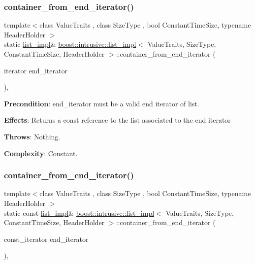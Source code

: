 \subsubsection{\texorpdfstring{container\+\_\+from\+\_\+end\+\_\+iterator()}{container\_from\_end\_iterator()}\hspace{0.1cm}{\footnotesize\ttfamily [1/2]}}
{\footnotesize\ttfamily template$<$class Value\+Traits , class Size\+Type , bool Constant\+Time\+Size, typename Header\+Holder $>$ \\
static \hyperlink{classboost_1_1intrusive_1_1list__impl}{list\+\_\+impl}\& \hyperlink{classboost_1_1intrusive_1_1list__impl}{boost\+::intrusive\+::list\+\_\+impl}$<$ Value\+Traits, Size\+Type, Constant\+Time\+Size, Header\+Holder $>$\+::container\+\_\+from\+\_\+end\+\_\+iterator (\begin{DoxyParamCaption}\item[{iterator}]{end\+\_\+iterator }\end{DoxyParamCaption})\hspace{0.3cm}{\ttfamily [inline]}, {\ttfamily [static]}}

{\bfseries Precondition}\+: end\+\_\+iterator must be a valid end iterator of list.

{\bfseries Effects}\+: Returns a const reference to the list associated to the end iterator

{\bfseries Throws}\+: Nothing.

{\bfseries Complexity}\+: Constant. \mbox{\label{classboost_1_1intrusive_1_1list__impl_a1dabad9119bf0e3ab256f08944e14521}} 
\subsubsection{\texorpdfstring{container\+\_\+from\+\_\+end\+\_\+iterator()}{container\_from\_end\_iterator()}\hspace{0.1cm}{\footnotesize\ttfamily [2/2]}}
{\footnotesize\ttfamily template$<$class Value\+Traits , class Size\+Type , bool Constant\+Time\+Size, typename Header\+Holder $>$ \\
static const \hyperlink{classboost_1_1intrusive_1_1list__impl}{list\+\_\+impl}\& \hyperlink{classboost_1_1intrusive_1_1list__impl}{boost\+::intrusive\+::list\+\_\+impl}$<$ Value\+Traits, Size\+Type, Constant\+Time\+Size, Header\+Holder $>$\+::container\+\_\+from\+\_\+end\+\_\+iterator (\begin{DoxyParamCaption}\item[{const\+\_\+iterator}]{end\+\_\+iterator }\end{DoxyParamCaption})\hspace{0.3cm}{\ttfamily [inline]}, {\ttfamily [static]}}

